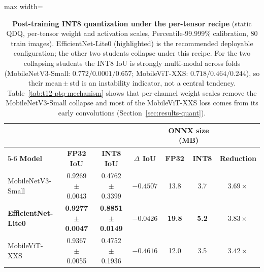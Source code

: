 \begin{table}[ht]
\centering
\caption{\textbf{Post-training INT8 quantization under the per-tensor recipe} (static QDQ, per-tensor weight and activation scales, Percentile-99.999\% calibration, 80 train images). EfficientNet-Lite0 (highlighted) is the recommended deployable configuration; the other two students collapse under this recipe. For the two collapsing students the INT8 IoU is strongly multi-modal across folds (MobileNetV3-Small: $0.772 / 0.0001 / 0.657$; MobileViT-XXS: $0.718 / 0.464 / 0.244$), so their mean\,$\pm$\,std is an instability indicator, not a central tendency. Table~\ref{tab:t12-ptq-mechanism} shows that per-channel weight scales remove the MobileNetV3-Small collapse and most of the MobileViT-XXS loss comes from its early convolutions (Section~\ref{sec:results-quant}).}
\label{tab:t4-quant}
\small
\setlength{\tabcolsep}{4pt}
\begin{adjustbox}{max width=\textwidth}
\begin{tabular}{lcccccc}
\toprule
& & & & \multicolumn{2}{c}{\textbf{ONNX size (MB)}} & \\
\cmidrule(lr){5-6}
\textbf{Model} & \textbf{FP32 IoU} & \textbf{INT8 IoU} & \textbf{$\Delta$ IoU} & \textbf{FP32} & \textbf{INT8} & \textbf{Reduction} \\
\midrule
MobileNetV3-Small   & 0.9269 $\pm$ 0.0043 & 0.4762 $\pm$ 0.3399 & $-0.4507$ & 13.8 & 3.7 & $3.69\times$ \\
\textbf{EfficientNet-Lite0} & \textbf{0.9277 $\pm$ 0.0047} & \textbf{0.8851 $\pm$ 0.0149} & $\boldsymbol{-0.0426}$ & \textbf{19.8} & \textbf{5.2} & $\boldsymbol{3.83\times}$ \\
MobileViT-XXS       & 0.9367 $\pm$ 0.0055 & 0.4752 $\pm$ 0.1936 & $-0.4616$ & 12.0 & 3.5 & $3.42\times$ \\
\bottomrule
\end{tabular}
\end{adjustbox}
\end{table}
